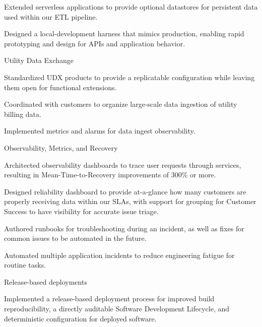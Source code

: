 \begin{cventries}
{\begin{cvitems}
        \item {Extended serverless applications to provide optional datastores for persistent data used within our ETL pipeline.}
        \item {Designed a local-development harness that mimics production, enabling rapid prototyping and design for APIs and application behavior.}
      \end{cvitems}
    }
  \cventry
    {} {Utility Data Exchange} {} {} {
      \begin{cvitems}
        \item {Standardized UDX products to provide a replicatable configuration while leaving them open for functional extensions.}
        \item {Coordinated with customers to organize large-scale data ingestion of utility billing data.}
        \item {Implemented metrics and alarms for data ingest observability.}
      \end{cvitems}
    }
  \cventry
    {} {Observability, Metrics, and Recovery} {} {} {
      \begin{cvitems}
        \item {Architected observability dashboards to trace user requests through services, resulting in Mean-Time-to-Recovery improvements of 300\% or more.}
        \item {Designed reliability dashboard to provide at-a-glance how many customers are properly receiving data within our SLAs, with support for grouping for Customer Success to have visibility for accurate issue triage.}
        \item {Authored runbooks for troubleshooting during an incident, as well as fixes for common issues to be automated in the future.}
        \item {Automated multiple application incidents to reduce engineering fatigue for routine tasks.}
      \end{cvitems}
    }
  \cventry
    {} {Release-based deployments} {} {} {
      \begin{cvitems}
        \item {Implemented a release-based deployment process for improved build reproducibility, a directly auditable Software Development Lifecycle, and deterministic configuration for deployed software.}
      \end{cvitems}
    }



\end{cventries}
